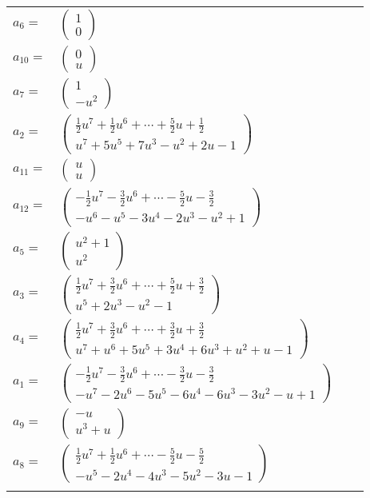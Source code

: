 \documentclass[1p]{elsarticle_modified}
\theoremstyle{definition}
\begin{document}
\begin{tabular}{m{7pt} m{180pt} m{7pt} m{180pt} }
\flushright $a_{6}=$&$\begin{pmatrix}1\\0\end{pmatrix}$ \\
\flushright $a_{10}=$&$\begin{pmatrix}0\\u\end{pmatrix}$ \\
\flushright $a_{7}=$&$\begin{pmatrix}1\\- u^2\end{pmatrix}$ \\
\flushright $a_{2}=$&$\begin{pmatrix}\frac{1}{2} u^7+\frac{1}{2} u^6+\cdots+\frac{5}{2} u+\frac{1}{2}\\u^7+5 u^5+7 u^3- u^2+2 u-1\end{pmatrix}$ \\
\flushright $a_{11}=$&$\begin{pmatrix}u\\u\end{pmatrix}$ \\
\flushright $a_{12}=$&$\begin{pmatrix}-\frac{1}{2} u^7-\frac{3}{2} u^6+\cdots-\frac{5}{2} u-\frac{3}{2}\\- u^6- u^5-3 u^4-2 u^3- u^2+1\end{pmatrix}$ \\
\flushright $a_{5}=$&$\begin{pmatrix}u^2+1\\u^2\end{pmatrix}$ \\
\flushright $a_{3}=$&$\begin{pmatrix}\frac{1}{2} u^7+\frac{3}{2} u^6+\cdots+\frac{5}{2} u+\frac{3}{2}\\u^5+2 u^3- u^2-1\end{pmatrix}$ \\
\flushright $a_{4}=$&$\begin{pmatrix}\frac{1}{2} u^7+\frac{3}{2} u^6+\cdots+\frac{3}{2} u+\frac{3}{2}\\u^7+u^6+5 u^5+3 u^4+6 u^3+u^2+u-1\end{pmatrix}$ \\
\flushright $a_{1}=$&$\begin{pmatrix}-\frac{1}{2} u^7-\frac{3}{2} u^6+\cdots-\frac{3}{2} u-\frac{3}{2}\\- u^7-2 u^6-5 u^5-6 u^4-6 u^3-3 u^2- u+1\end{pmatrix}$ \\
\flushright $a_{9}=$&$\begin{pmatrix}- u\\u^3+u\end{pmatrix}$ \\
\flushright $a_{8}=$&$\begin{pmatrix}\frac{1}{2} u^7+\frac{1}{2} u^6+\cdots-\frac{5}{2} u-\frac{5}{2}\\- u^5-2 u^4-4 u^3-5 u^2-3 u-1\end{pmatrix}$\\&\end{tabular}
\end{document}
